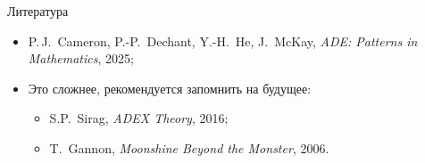 \documentclass[serif, aspectratio=169]{beamer}
\begin{document}
\begin{frame}{Литература}
    \begin{itemize}[<.->]
        \item P.\,J.~Cameron, P.-P.~Dechant, Y.-H.~He, J.~McKay, \textit{ADE: Patterns in Mathematics}, 2025;
        \item Это сложнее, рекомендуется запомнить на будущее:
        \begin{itemize}
            \item S.P.~Sirag, \textit{ADEX Theory}, 2016;
            \item T.~Gannon, \textit{Moonshine Beyond the Monster}, 2006.
        \end{itemize}
    \end{itemize}
    \note{
        \begin{itemize}
            \item ---
        \end{itemize}
    }
\end{frame}
\end{document}

